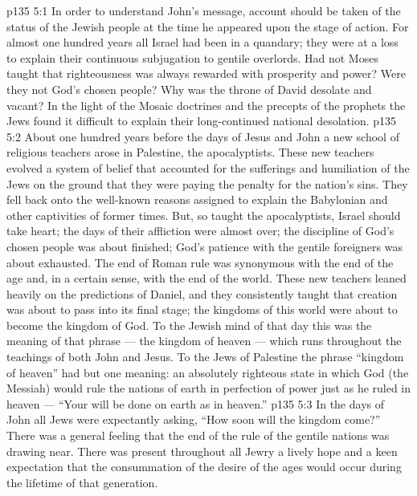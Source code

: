 \vs p135 5:1 In order to understand John’s message, account should be taken of the status of the Jewish people at the time he appeared upon the stage of action. For almost one hundred years all Israel had been in a quandary; they were at a loss to explain their continuous subjugation to gentile overlords. Had not Moses taught that righteousness was always rewarded with prosperity and power? Were they not God’s chosen people? Why was the throne of David desolate and vacant? In the light of the Mosaic doctrines and the precepts of the prophets the Jews found it difficult to explain their long\hyp{}continued national desolation.
\vs p135 5:2 About one hundred years before the days of Jesus and John a new school of religious teachers arose in Palestine, the apocalyptists. These new teachers evolved a system of belief that accounted for the sufferings and humiliation of the Jews on the ground that they were paying the penalty for the nation’s sins. They fell back onto the well\hyp{}known reasons assigned to explain the Babylonian and other captivities of former times. But, so taught the apocalyptists, Israel should take heart; the days of their affliction were almost over; the discipline of God’s chosen people was about finished; God’s patience with the gentile foreigners was about exhausted. The end of Roman rule was synonymous with the end of the age and, in a certain sense, with the end of the world. These new teachers leaned heavily on the predictions of Daniel, and they consistently taught that creation was about to pass into its final stage; the kingdoms of this world were about to become the kingdom of God. To the Jewish mind of that day this was the meaning of that phrase --- the kingdom of heaven --- which runs throughout the teachings of both John and Jesus. To the Jews of Palestine the phrase “kingdom of heaven” had but one meaning: an absolutely righteous state in which God (the Messiah) would rule the nations of earth in perfection of power just as he ruled in heaven --- “Your will be done on earth as in heaven.”
\vs p135 5:3 In the days of John all Jews were expectantly asking, “How soon will the kingdom come?” There was a general feeling that the end of the rule of the gentile nations was drawing near. There was present throughout all Jewry a lively hope and a keen expectation that the consummation of the desire of the ages would occur during the lifetime of that generation.
